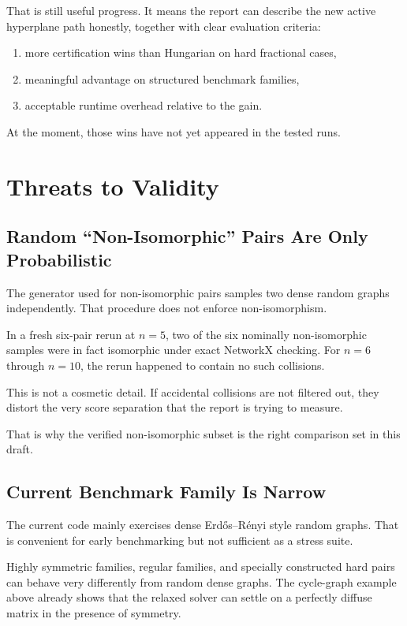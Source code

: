 \documentclass[11pt]{article}
\begin{document}
That is still useful progress.
It means the report can describe the new active hyperplane path honestly, together with clear evaluation criteria:
\begin{enumerate}[label=\arabic*.]
    \item more certification wins than Hungarian on hard fractional cases,
    \item meaningful advantage on structured benchmark families,
    \item acceptable runtime overhead relative to the gain.
\end{enumerate}

At the moment, those wins have not yet appeared in the tested runs.

\section{Threats to Validity}

\subsection{Random ``Non-Isomorphic'' Pairs Are Only Probabilistic}

The generator used for non-isomorphic pairs samples two dense random graphs independently.
That procedure does not enforce non-isomorphism.

In a fresh six-pair rerun at $n=5$,
two of the six nominally non-isomorphic samples were in fact isomorphic under exact NetworkX checking.
For $n=6$ through $n=10$, the rerun happened to contain no such collisions.

This is not a cosmetic detail.
If accidental collisions are not filtered out, they distort the very score separation that the report is trying to measure.

That is why the verified non-isomorphic subset is the right comparison set in this draft.

\subsection{Current Benchmark Family Is Narrow}

The current code mainly exercises dense Erd\H{o}s--R\'enyi style random graphs.
That is convenient for early benchmarking but not sufficient as a stress suite.

Highly symmetric families, regular families, and specially constructed hard pairs can behave very differently from random dense graphs.
The cycle-graph example above already shows that the relaxed solver can settle on a perfectly diffuse matrix in the presence of symmetry.
\end{document}
